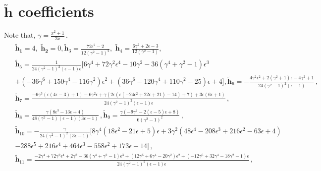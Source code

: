 \section{\texorpdfstring{$\boldsymbol{\tilde{h}}$ coefficients}{tilde-h coefficients}} \label{ch3:app:E}
Note that, $\gamma=\frac{x^2+1}{2 x}\,.$
\begin{align}
    \begin{split}
   &  \boldsymbol{\tilde h_1}=4,\,\,
      \boldsymbol{\boldsymbol{\tilde h_2}}   =0,
     \boldsymbol{\tilde h}_3=\frac{72 \epsilon ^2-2}{12 \left(\gamma ^2-1\right)^2},\,\,
        \boldsymbol{\tilde h}_4=\frac{6 \gamma ^2+2 \epsilon -3}{12 \left(\gamma ^2-1\right)},\\& \boldsymbol{\tilde h}_5=\frac{1}{24 \left(\gamma ^2-1\right)^2 (\epsilon -1) \epsilon }\Bigg[6 \gamma ^4+72 \gamma ^2 \epsilon ^4-10 \gamma ^2-36 \left(\gamma ^4+\gamma ^2-1\right) \epsilon ^3\\&+\left(-36 \gamma ^6+150 \gamma ^4-116 \gamma ^2\right) \epsilon ^2+\left(36 \gamma ^6-120 \gamma ^4+110 \gamma ^2-25\right) \epsilon +4\Bigg],
       \boldsymbol{\tilde h}_6=-\frac{4 \gamma ^2 \epsilon ^2+2 \left(\gamma ^2+1\right) \epsilon -4 \gamma ^2+1}{24 \left(\gamma ^2-1\right)^2 (\epsilon -1)}\,,\\ &
       \boldsymbol{\tilde h}_7=\frac{-6 \gamma ^3 (\epsilon  (4 \epsilon -3)+1)-6 \gamma ^2 \epsilon +\gamma  \left(2 \epsilon  \left(\epsilon  \left(-24 \epsilon ^2+22 \epsilon +21\right)-14\right)+7\right)+3 \epsilon  (6 \epsilon +1)}{24 \left(\gamma ^2-1\right)^2 (\epsilon -1) \epsilon }\,,\\ &
   \boldsymbol{\tilde h}_8    =\frac{\gamma  \left(8 \epsilon ^3-13 \epsilon +4\right)}{48 \left(\gamma ^2-1\right) (\epsilon -1) (3 \epsilon -1)}\,,
    \boldsymbol{\tilde h}_9 =\frac{\gamma  \left(-9 \gamma ^2-2 (\epsilon -5) \epsilon +8\right)}{6 \left(\gamma ^2-1\right)^2}\,,
    \\&
    \boldsymbol{\tilde h}_{10}  =-\frac{\gamma}{24 \left(\gamma ^2-1\right)^2 (3 \epsilon -1)}\Bigg[8 \gamma ^4 \left(18 \epsilon ^2-21 \epsilon +5\right) \epsilon +3 \gamma ^2 \left(48 \epsilon ^4-208 \epsilon ^3+216 \epsilon ^2-63 \epsilon +4\right)\\&-288 \epsilon ^5+216 \epsilon ^4+464 \epsilon ^3-558 \epsilon ^2+173 \epsilon -14\Bigg]\,,
    \\ &\boldsymbol{\tilde h}_{11}=\frac{-2 \gamma ^4+72 \gamma ^2 \epsilon ^4+2 \gamma ^2-36 \left(\gamma ^4+\gamma ^2-1\right) \epsilon ^3+\left(12 \gamma ^6+6 \gamma ^4-20 \gamma ^2\right) \epsilon ^2+\left(-12 \gamma ^6+32 \gamma ^4-18 \gamma ^2-1\right) \epsilon }{24 \left(\gamma ^2-1\right)^2 (\epsilon -1) \epsilon}\,,\\ &

\end{split}
\end{align}
